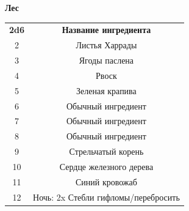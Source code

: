 \documentclass[a4paper, 9pt, twocolumn]{book}
\begin{document}
\begin{table}[H]
	
	{\Large \textbf{Лес}}
	
	\medspace 
	
	\centering 
	
	\begin{tabularx}{\linewidth}{c C}
		
		\textbf{2d6} & \textbf{Название ингредиента} \\
		
		2 & Листья Харрады \\
		
		3 & Ягоды паслена  \\
		
		4 & Рвоск \\
		
		5 & Зеленая крапива  \\
		
		6 & Обычный ингредиент \\
		
		7 & Обычный ингредиент \\
		
		8 & Обычный ингредиент \\
		
		9 & Стрельчатый корень  \\
		
		10 & Сердце железного дерева  \\
		
		11 & Синий кровожаб  \\
		
		12 & Ночь: 2x Стебли гифломы/перебросить
	\end{tabularx}
\end{table}
\end{document}
